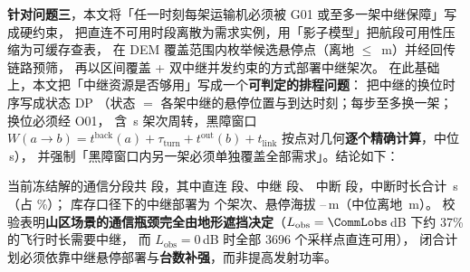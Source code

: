\documentclass[12pt,a4paper,fontset=windows]{ctexart}
\begin{document}
\textbf{针对问题三}，本文将「任一时刻每架运输机必须被 G01 或至多一架中继保障」写成硬约束，
把直连不可用时段离散为需求实例，用「影子模型」把航段可用性压缩为可缓存查表，
在 DEM 覆盖范围内枚举候选悬停点（离地 $\le$ \RelayAglMax\,m）并经回传链路预筛，
再以区间覆盖 + 双中继并发约束的方式部署中继架次。
在此基础上，本文把「中继资源是否够用」写成一个\textbf{可判定的排程问题}：
把中继的换位时序写成状态 DP
（状态 $=$ 各架中继的悬停位置与到达时刻；每步至多换一架；换位必须经 O01，
含 \CommTurn\,s 架次周转，黑障窗口 $W(a\!\to\!b)=t^{\mathrm{back}}(a)+\tau_{\mathrm{turn}}+t^{\mathrm{out}}(b)+t_{\mathrm{link}}$
按点对几何\textbf{逐个精确计算}，中位 \QthreeDpBlackoutMedianS\,s），
并强制「黑障窗口内另一架必须单独覆盖全部需求」。结论如下：

\begin{center}
\end{center}

\noindent
当前冻结解的通信分段共 \CommSegN 段，其中直连 \CommSegDirect 段、中继 \CommSegRelay 段、
中断 \CommSegNone 段，中断时长合计 \CommTimeNone\,s（占 \CommNonePct\%）；
库存口径下的中继部署为 \QthreeRelaySorties 个架次、悬停海拔
\QthreeRelayAltMin--\QthreeRelayAltMax\,m（中位离地 \QthreeRelayAgl\,m）。
校验表明\textbf{山区场景的通信瓶颈完全由地形遮挡决定}（$L_{\mathrm{obs}}=\CommLobs$\,dB 下约 37\% 的飞行时长需要中继，
而 $L_{\mathrm{obs}}=0$\,dB 时全部 3696 个采样点直连可用），
闭合计划必须依靠中继悬停部署与\textbf{台数补强}，而非提高发射功率。
\end{document}
